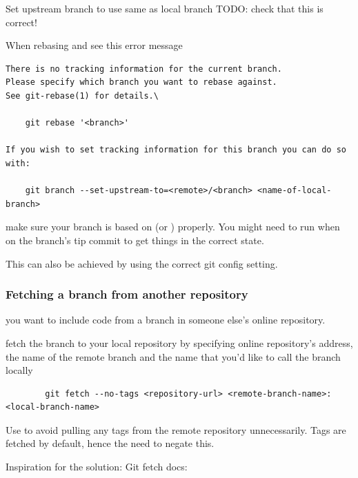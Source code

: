 \begin{frame}[fragile]{Set upstream branch to use same as local branch}
    TODO: check that this is correct!

When rebasing and see this error message
\begin{verbatim}
There is no tracking information for the current branch.
Please specify which branch you want to rebase against.
See git-rebase(1) for details.\

    git rebase '<branch>'

If you wish to set tracking information for this branch you can do so with:

    git branch --set-upstream-to=<remote>/<branch> <name-of-local-branch>
\end{verbatim}

    make sure your branch is based on  (or )
    properly.  You might need to run  when on the
    branch's tip commit to get things in the correct state.

    This can also be achieved by using the correct git config setting.
\end{frame}

\begin{frame}[fragile]
    \frametitle{Fetching a branch from another repository}
     you want to include code from a branch in someone else's
        online repository.

     fetch the branch to your local repository by specifying
        online repository's address, the name of the remote branch and the
        name that you'd like to call the branch locally
    \begin{verbatim}
        git fetch --no-tags <repository-url> <remote-branch-name>:<local-branch-name>
    \end{verbatim}

    Use  to avoid pulling any tags from the remote
    repository unnecessarily.  Tags are fetched by default, hence the need
    to negate this.

    Inspiration for the solution:
    Git fetch docs:
\end{frame}
